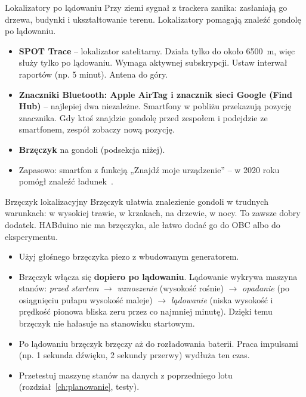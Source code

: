 \begin{sekcja}{Lokalizatory po lądowaniu}\label{sec:lokalizatory}
Przy ziemi sygnał z trackera zanika: zasłaniają go drzewa, budynki i ukształtowanie terenu. Lokalizatory pomagają znaleźć gondolę po lądowaniu.

\begin{itemize}
  \item \textbf{SPOT Trace} -- lokalizator satelitarny. Działa tylko do około \SI{6500}{m}, więc służy tylko po lądowaniu. Wymaga aktywnej subskrypcji. Ustaw interwał raportów (np. 5 minut). Antena do góry.
  \item \textbf{Znaczniki Bluetooth: Apple AirTag i znacznik sieci Google (Find Hub)} -- najlepiej dwa niezależne. Smartfony w pobliżu przekazują pozycję znacznika. Gdy ktoś znajdzie gondolę przed zespołem i podejdzie ze smartfonem, zespół zobaczy nową pozycję.
  \item \textbf{Brzęczyk} na gondoli (podsekcja niżej).
  \item Zapasowo: smartfon z funkcją „Znajdź moje urządzenie” -- w 2020 roku pomógł znaleźć ładunek~\cite{raport2020}.
\end{itemize}
\end{sekcja}

\begin{podsekcja}{Brzęczyk lokalizacyjny}
Brzęczyk ułatwia znalezienie gondoli w trudnych warunkach: w wysokiej trawie, w krzakach, na drzewie, w nocy. To zawsze dobry dodatek. HABduino nie ma brzęczyka, ale łatwo dodać go do OBC albo do eksperymentu.
\begin{itemize}
  \item Użyj głośnego brzęczyka piezo z wbudowanym generatorem.
  \item Brzęczyk włącza się \textbf{dopiero po lądowaniu}. Lądowanie wykrywa maszyna stanów: \emph{przed startem} $\to$ \emph{wznoszenie} (wysokość rośnie) $\to$ \emph{opadanie} (po osiągnięciu pułapu wysokość maleje) $\to$ \emph{lądowanie} (niska wysokość i prędkość pionowa bliska zeru przez co najmniej minutę). Dzięki temu brzęczyk nie hałasuje na stanowisku startowym.
  \item Po lądowaniu brzęczyk brzęczy aż do rozładowania baterii. Praca impulsami (np. 1 sekunda dźwięku, 2 sekundy przerwy) wydłuża ten czas.
  \item Przetestuj maszynę stanów na danych z poprzedniego lotu (rozdział~\ref{ch:planowanie}, testy).
\end{itemize}
\end{podsekcja}

